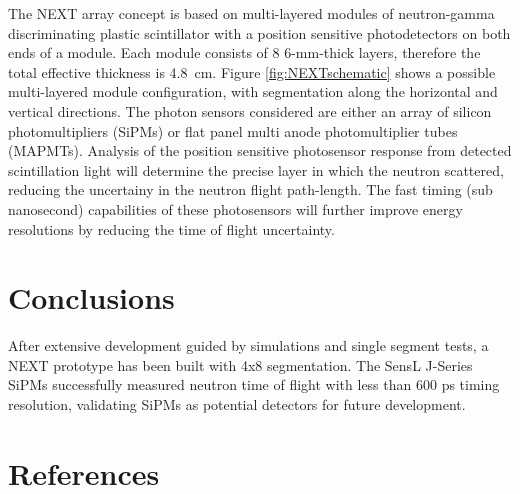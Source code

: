 \documentclass[preprint,3p,twocolumn]{elsarticle}
\begin{document}
The NEXT array concept is based on multi-layered modules of neutron-gamma discriminating plastic scintillator with a position sensitive photodetectors on both ends of a module. Each module consists of 8 6-mm-thick layers, therefore the total effective thickness is 4.8~cm. Figure \ref{fig:NEXTschematic} shows a possible multi-layered module configuration, with segmentation along the horizontal and vertical directions. The photon sensors considered are either an array of silicon photomultipliers (SiPMs) or flat panel multi anode photomultiplier tubes (MAPMTs). Analysis of the position sensitive photosensor response from detected scintillation light will determine the precise layer in which the neutron scattered, reducing the uncertainy in the neutron flight path-length. The fast timing (sub nanosecond) capabilities of these photosensors will further improve energy resolutions by reducing the time of flight uncertainty. 





\section{Conclusions}
After extensive development guided by simulations and single segment tests, a NEXT prototype has been built with 4x8 segmentation. The SensL\textsuperscript{\texttrademark} J-Series SiPMs successfully measured neutron time of flight with less than 600 ps timing resolution, validating SiPMs as potential detectors for future development.

\section*{References}
%

\end{document}
